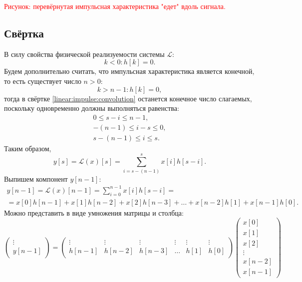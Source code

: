 \textcolor{red}{Рисунок: перевёрнутая импульсная характеристика "едет"{} вдоль сигнала.}

\subsection{Свёртка}

В силу свойства физической реализуемости системы $\mathcal{L}$:
\[
    k < 0 : h[k] = 0 .
\]
Будем дополнительно считать, что импульсная характеристика является конечной, то есть существует число $n>0$:
\[
    k > n-1 : h[k] = 0 ,
\]
тогда в свёртке \eqref{linear:impulse:convolution} останется конечное число слагаемых, поскольку одновременно должны выполняться равенства:
\begin{gather*}
    0 \le s - i \le n-1 , \\
    -(n - 1) \le i - s \le 0 , \\
    s - (n - 1) \le i \le s .
\end{gather*}
Таким образом,
\[
    y[s]
    = \mathcal{L}(x)[s]
    = \sum_{i=s-(n-1)}^s x[i] h[s-i] .
\]
Выпишем компонент $y[n-1]$:
\begin{multline*}
    y[n-1]
    = \mathcal{L}(x)[n-1]
    = \sum_{i=0}^{n-1} x[i] h[s-i] = \\
    = x[0] h[n-1] + x[1] h[n-2] + x[2] h[n-3] + \dots + x[n-2] h[1] + x[n-1] h[0] .
\end{multline*}
Можно представить в виде умножения матрицы и столбца:
\[
    \begin{pmatrix}
        \vdots \\
        y[n-1]
    \end{pmatrix}
    = \begin{pmatrix}
          \vdots & \vdots & \vdots & \vdots & \vdots & \vdots \\
          h[n-1] & h[n-2] & h[n-3] & \dots  & h[1]   & h[0]
    \end{pmatrix}
    \begin{pmatrix}
        x[0]   \\
        x[1]   \\
        x[2]   \\
        \vdots \\
        x[n-2] \\
        x[n-1]
    \end{pmatrix}
\]

